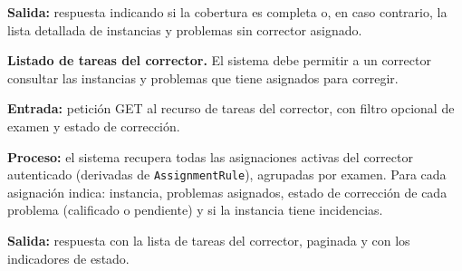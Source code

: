 \begin{functional}
    \textbf{Salida:} respuesta indicando si la cobertura es completa o, en caso contrario,
    la lista detallada de instancias y problemas sin corrector asignado.

    \item \textbf{Listado de tareas del corrector.} \label{rf:assignment:tasks}
    El sistema debe permitir a un corrector consultar las instancias y problemas que tiene
    asignados para corregir.

    \textbf{Entrada:} petición GET al recurso de tareas del corrector, con filtro opcional
    de examen y estado de corrección.

    \textbf{Proceso:} el sistema recupera todas las asignaciones activas del corrector
    autenticado (derivadas de \texttt{AssignmentRule}), agrupadas por examen. Para cada
    asignación indica: instancia, problemas asignados, estado de corrección de cada
    problema (calificado o pendiente) y si la instancia tiene incidencias.

    \textbf{Salida:} respuesta con la lista de tareas del corrector, paginada y con los
    indicadores de estado.

\end{functional}
